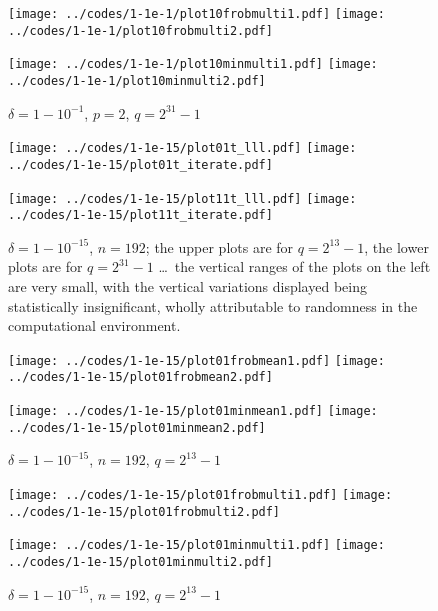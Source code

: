 \documentclass[supplement,hidelinks,onefignum,onetabnum]{siamart220329}
\begin{document}
\begin{figure}
\begin{centering}
{\texttt{[image: ../codes/1-1e-1/plot10frobmulti1.pdf]}}
{\texttt{[image: ../codes/1-1e-1/plot10frobmulti2.pdf]}}

{\texttt{[image: ../codes/1-1e-1/plot10minmulti1.pdf]}}
{\texttt{[image: ../codes/1-1e-1/plot10minmulti2.pdf]}}

\end{centering}
\caption{$\delta = 1-10^{-1}$, $p = 2$, $q = 2^{31} - 1$}
\label{p2err1-1e-1-31}
\end{figure}

\begin{figure}
\begin{centering}
{\texttt{[image: ../codes/1-1e-15/plot01t\_lll.pdf]}}
{\texttt{[image: ../codes/1-1e-15/plot01t\_iterate.pdf]}}

{\texttt{[image: ../codes/1-1e-15/plot11t\_lll.pdf]}}
{\texttt{[image: ../codes/1-1e-15/plot11t\_iterate.pdf]}}

\end{centering}
\caption{$\delta = 1-10^{-15}$, $n = 192$;
         the upper plots are for $q = 2^{13} - 1$,
         the lower plots are for $q = 2^{31} - 1$ \dots\
         the vertical ranges of the plots on the left are very small,
         with the vertical variations displayed
         being statistically insignificant, wholly attributable to randomness
         in the computational environment.}
\label{pstime1-1e-15}
\end{figure}

\begin{figure}
\begin{centering}
{\texttt{[image: ../codes/1-1e-15/plot01frobmean1.pdf]}}
{\texttt{[image: ../codes/1-1e-15/plot01frobmean2.pdf]}}

{\texttt{[image: ../codes/1-1e-15/plot01minmean1.pdf]}}
{\texttt{[image: ../codes/1-1e-15/plot01minmean2.pdf]}}

\end{centering}
\caption{$\delta = 1-10^{-15}$, $n = 192$, $q = 2^{13} - 1$}
\end{figure}

\begin{figure}
\begin{centering}
{\texttt{[image: ../codes/1-1e-15/plot01frobmulti1.pdf]}}
{\texttt{[image: ../codes/1-1e-15/plot01frobmulti2.pdf]}}

{\texttt{[image: ../codes/1-1e-15/plot01minmulti1.pdf]}}
{\texttt{[image: ../codes/1-1e-15/plot01minmulti2.pdf]}}

\end{centering}
\caption{$\delta = 1-10^{-15}$, $n = 192$, $q = 2^{13} - 1$}
\end{figure}
\end{document}
